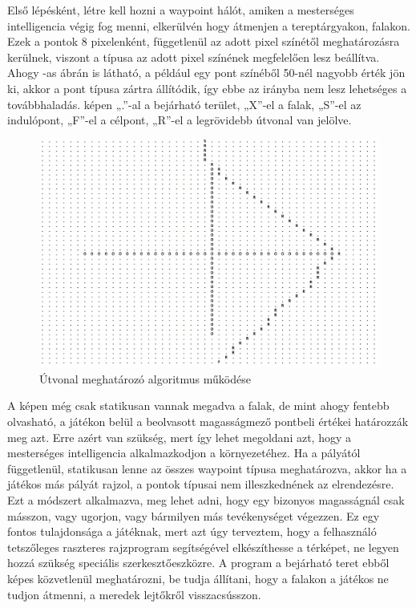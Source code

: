 Első lépésként, létre kell hozni a waypoint hálót, amiken a mesterséges intelligencia végig fog menni, elkerülvén hogy átmenjen a tereptárgyakon, falakon. Ezek a pontok 8 pixelenként, függetlenül az adott pixel színétől meghatározásra kerülnek, viszont a típusa az adott pixel színének megfelelően lesz beállítva. Ahogy -as ábrán is látható, a például egy pont színéből 50-nél nagyobb érték jön ki, akkor a pont típusa zártra állítódik, így ebbe az irányba nem lesz lehetséges a továbbhaladás.   képen „.”-al a bejárható terület, „X”-el a falak, „S”-el az indulópont, „F”-el a célpont, „R”-el a legrövidebb útvonal van jelölve.

\begin{figure}[h]
\centering
\includegraphics[scale=0.23]{kepek/mi_printscreen.png}
\caption{Útvonal meghatározó algoritmus működése}
\label{fig:mi_printscreen}
\end{figure}

A képen még csak statikusan vannak megadva a falak, de mint ahogy fentebb olvasható, a játékon belül a beolvasott magasságmező pontbeli értékei határozzák meg azt. Erre azért van szükség, mert így lehet megoldani azt, hogy a mesterséges intelligencia alkalmazkodjon a környezetéhez. Ha a pályától függetlenül, statikusan lenne az összes waypoint típusa meghatározva, akkor ha a játékos más pályát rajzol, a pontok típusai nem illeszkednének az elrendezésre. Ezt a módszert alkalmazva, meg lehet adni, hogy egy bizonyos magasságnál csak másszon, vagy ugorjon, vagy bármilyen más tevékenységet végezzen. Ez egy fontos tulajdonsága a játéknak, mert azt úgy terveztem, hogy a felhasználó tetszőleges raszteres rajzprogram segítségével elkészíthesse a térképet, ne legyen hozzá szükség speciális szerkesztőeszközre. A program a bejárható teret ebből képes közvetlenül meghatározni, be tudja állítani, hogy a falakon a játékos ne tudjon átmenni, a meredek lejtőkről visszacsússzon.


